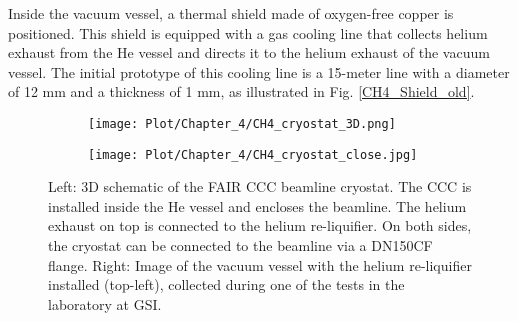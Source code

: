 \documentclass[12pt,a4paper]{report}
\begin{document}
       Inside the vacuum vessel, a thermal shield made of oxygen-free copper is positioned. This shield is equipped with a gas cooling line that collects helium exhaust from the He vessel and directs it to the helium exhaust of the vacuum vessel. The initial prototype of this cooling line is a 15-meter line with a diameter of 12 mm and a thickness of 1 mm, as illustrated in Fig. \ref{CH4_Shield_old}.
       
       \begin{figure}[H]
       	\begin{subfigure}[b]{0.65\textwidth}
       		\centering
       		\texttt{[image: Plot/Chapter\_4/CH4\_cryostat\_3D.png]}
       	\end{subfigure}
       	\hfill
       	\begin{subfigure}[b]{0.35\textwidth}
       		\centering
       		\texttt{[image: Plot/Chapter\_4/CH4\_cryostat\_close.jpg]}
       	\end{subfigure}
       	\caption{\small{Left: 3D schematic of the FAIR CCC beamline cryostat. The CCC is installed inside the He vessel and encloses the beamline. The helium exhaust on top is connected to the helium re-liquifier. On both sides, the cryostat can be connected to the beamline via a DN150CF flange. Right: Image of the vacuum vessel with the helium re-liquifier installed (top-left), collected during one of the tests in the laboratory at GSI.}}
       	\label{CH4_cryostat}
       \end{figure}
       
\end{document}
